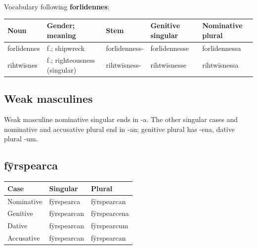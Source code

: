 Vocabulary following \textbf{forlidennes}:

\par\begingroup
\fontsize{10.5}{13.2}\selectfont
\setlength{\LTleft}{0pt}\setlength{\LTright}{\fill}
\noindent
\begin{tabular}{@{}>{\raggedright\arraybackslash}p{19mm}>{\raggedright\arraybackslash}p{25.5mm}>{\raggedright\arraybackslash}p{22mm}>{\raggedright\arraybackslash}p{23.125mm}>{\raggedright\arraybackslash}p{23.125mm}@{}}
\toprule
\textbf{Noun} & \textbf{Gender; meaning} & \textbf{Stem} & \textbf{Genitive singular} & \textbf{Nominative plural} \\
\midrule
forlidennes & f.; shipwreck & forlidenness- & forlidennesse & forlidennessa \\
rihtwīsnes & f.; righteousness (singular) & rihtwīsness- & rihtwīsnesse & rihtwīsnessa \\
\bottomrule
\end{tabular}
\par\endgroup

\subsection*{Weak masculines}

Weak masculine nominative singular ends in -a. The other singular cases and nominative and accusative plural end in -an; genitive plural has -ena, dative plural -um.

\subsection*{fȳrspearca}

\par\begingroup
\fontsize{10.5}{13.2}\selectfont
\setlength{\LTleft}{0pt}\setlength{\LTright}{\fill}
\noindent
\begin{tabular}{@{}>{\raggedright\arraybackslash}p{35.87mm}>{\raggedright\arraybackslash}p{39.46mm}>{\raggedright\arraybackslash}p{43.05mm}@{}}
\toprule
\textbf{Case} & \textbf{Singular} & \textbf{Plural} \\
\midrule
Nominative & fȳrspearca & fȳrspearcan \\
Genitive & fȳrspearcan & fȳrspearcena \\
Dative & fȳrspearcan & fȳrspearcum \\
Accusative & fȳrspearcan & fȳrspearcan \\
\bottomrule
\end{tabular}
\par\endgroup

